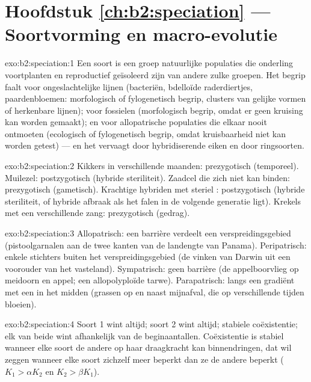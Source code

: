 \section*{Hoofdstuk \ref{ch:b2:speciation} --- Soortvorming en macro-evolutie}

\begin{solution}{exo:b2:speciation:1}
Een soort is een groep natuurlijke populaties die onderling voortplanten en
reproductief geïsoleerd zijn van andere zulke groepen. Het begrip faalt voor
ongeslachtelijke lijnen (bacteriën, bdelloïde raderdiertjes, paardenbloemen:
morfologisch of fylogenetisch begrip, clusters van gelijke vormen of
herkenbare lijnen); voor fossielen (morfologisch begrip, omdat er geen
kruising kan worden gemaakt); en voor allopatrische populaties die elkaar nooit
ontmoeten (ecologisch of fylogenetisch begrip, omdat kruisbaarheid niet
kan worden getest) --- en het vervaagt door hybridiserende eiken en door
ringsoorten.
\end{solution}

\begin{solution}{exo:b2:speciation:2}
Kikkers in verschillende maanden: prezygotisch (temporeel). Muilezel:
postzygotisch (hybride steriliteit). Zaadcel die zich niet kan binden:
prezygotisch (gametisch). Krachtige hybriden met steriel : postzygotisch
(hybride steriliteit, of hybride afbraak als het falen in de volgende
generatie ligt). Krekels met een verschillende zang: prezygotisch (gedrag).
\end{solution}

\begin{solution}{exo:b2:speciation:3}
Allopatrisch: een barrière verdeelt een verspreidingsgebied (pistoolgarnalen
aan de twee kanten van de landengte van Panama). Peripatrisch: enkele stichters
buiten het verspreidingsgebied (de vinken van Darwin uit een voorouder van het
vasteland). Sympatrisch: geen barrière (de appelboorvlieg op meidoorn en appel;
een allopolyploïde tarwe). Parapatrisch: langs een gradiënt met een
 in het midden (grassen op en naast mijnafval, die op
verschillende tijden bloeien).
\end{solution}

\begin{solution}{exo:b2:speciation:4}
Soort 1 wint altijd; soort 2 wint altijd; stabiele coëxistentie;
elk van beide wint afhankelijk van de beginaantallen. Coëxistentie is stabiel
wanneer elke soort de andere op haar draagkracht kan binnendringen,
dat wil zeggen wanneer elke soort zichzelf meer beperkt dan ze de
andere beperkt ($K_1 > \alpha K_2$ en $K_2 > \beta K_1$).
\end{solution}

